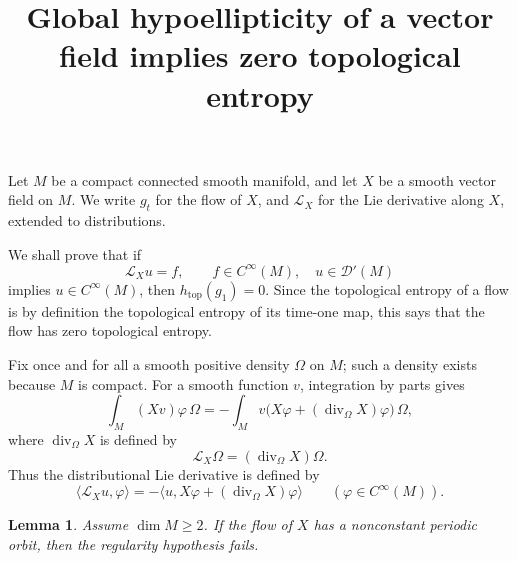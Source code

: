 \documentclass[11pt]{article}
\title{Global hypoellipticity of a vector field implies zero topological entropy}
\author{}
\date{}
\newtheorem{lemma}{Lemma}
\theoremstyle{remark}
\begin{document}
\maketitle

Let \(M\) be a compact connected smooth manifold, and let \(X\) be a smooth vector field on \(M\). We write \(g_t\) for the flow of \(X\), and \(\mathcal{L}_X\) for the Lie derivative along \(X\), extended to distributions.

We shall prove that if
\[
\mathcal{L}_X u=f,\qquad f\in C^\infty(M),\quad u\in \mathcal{D}'(M)
\]
implies \(u\in C^\infty(M)\), then \(h_{\mathrm{top}}(g_1)=0\). Since the topological entropy of a flow is by definition the topological entropy of its time-one map, this says that the flow has zero topological entropy.

Fix once and for all a smooth positive density \(\Omega\) on \(M\); such a density exists because \(M\) is compact. For a smooth function \(v\), integration by parts gives
\[
\int_M (Xv)\varphi\,\Omega
=
-\int_M v\bigl(X\varphi+(\operatorname{div}_\Omega X)\varphi\bigr)\,\Omega,
\]
where \(\operatorname{div}_\Omega X\) is defined by
\[
\mathcal{L}_X\Omega=(\operatorname{div}_\Omega X)\Omega.
\]
Thus the distributional Lie derivative is defined by
\begin{equation}
\langle \mathcal{L}_X u,\varphi\rangle
=
-\langle u,X\varphi+(\operatorname{div}_\Omega X)\varphi\rangle
\qquad(\varphi\in C^\infty(M)).
\end{equation}

\begin{lemma}\label{lem:periodic}
Assume \(\dim M\ge 2\). If the flow of \(X\) has a nonconstant periodic orbit, then the regularity hypothesis fails.
\end{lemma}
\end{document}
